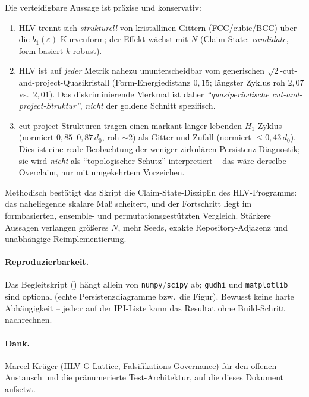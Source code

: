 Die verteidigbare Aussage ist präzise und konservativ:
\begin{enumerate}
  \item HLV trennt sich \emph{strukturell} von kristallinen Gittern
        (FCC/cubic/BCC) über die $b_1(\varepsilon)$-Kurvenform; der Effekt
        wächst mit $N$ (Claim-State: \emph{candidate}, form-basiert
        $k$-robust).
  \item HLV ist auf \emph{jeder} Metrik nahezu ununterscheidbar vom
        generischen $\sqrt{2}$-cut-and-project-Quasikristall (Form-Energie\-distanz
        $0{,}15$; längster Zyklus roh $2{,}07$ vs.\ $2{,}01$). Das diskriminierende
        Merkmal ist daher \emph{``quasiperiodische cut-and-project-Struktur''},
        \emph{nicht} der goldene Schnitt spezifisch.
  \item cut-project-Strukturen tragen einen markant länger lebenden
        $H_1$-Zyklus (normiert $0{,}85$--$0{,}87\,d_0$, roh $\sim\!2$) als Gitter und Zufall (normiert $\le 0{,}43\,d_0$).
        Dies ist eine reale Beobachtung der weniger zirkulären
        Persistenz-Diagnostik; sie wird \emph{nicht} als ``topologischer
        Schutz'' interpretiert -- das wäre derselbe Overclaim, nur mit
        umgekehrtem Vorzeichen.
\end{enumerate}

Methodisch bestätigt das Skript die Claim-State-Disziplin des HLV-Programms:
das naheliegende skalare Maß scheitert, und der Fortschritt liegt im
form\-basierten, ensemble- und permutations\-gestützten Vergleich. Stärkere
Aussagen verlangen größeres $N$, mehr Seeds, exakte Repository-Adjazenz und
unabhängige Reimplementierung.

\paragraph{Reproduzierbarkeit.} Das Begleitskript
() hängt allein von
\texttt{numpy}/\texttt{scipy} ab; \texttt{gudhi} und \texttt{matplotlib} sind
optional (echte Persistenzdiagramme bzw.\ die Figur). Bewusst keine harte
Abhängigkeit -- jede:r auf der IPI-Liste kann das Resultat ohne Build-Schritt
nachrechnen.

\paragraph{Dank.} Marcel Krüger (HLV-G-Lattice, Falsifikations-Governance)
für den offenen Austausch und die pränumerierte Test-Architektur, auf die
dieses Dokument aufsetzt.

